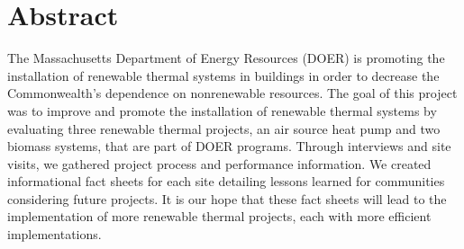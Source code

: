 \chapter*{Abstract}
%

\par The Massachusetts Department of Energy Resources (DOER) is promoting the installation of renewable thermal systems in buildings in order to decrease the Commonwealth’s dependence on nonrenewable resources. The goal of this project was to improve and promote the installation of renewable thermal systems by evaluating three renewable thermal projects, an air source heat pump and two biomass systems, that are part of DOER programs. Through interviews and site visits, we gathered project process and performance information. We created informational fact sheets for each site detailing lessons learned for communities considering future projects. It is our hope that these fact sheets will lead to the implementation of more renewable thermal projects, each with more efficient implementations.
